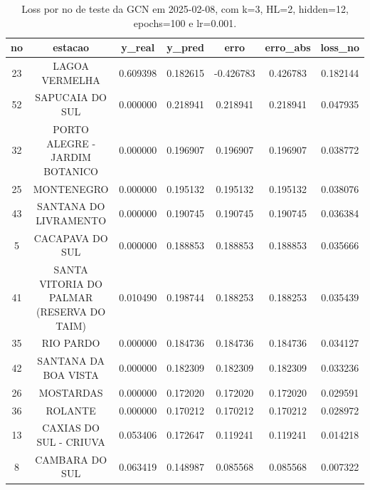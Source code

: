 \begin{table}[h]
\centering
\caption{Loss por no de teste da GCN em 2025-02-08, com k=3, HL=2, hidden=12, epochs=100 e lr=0.001.}
\label{tab:gcn_loss_k3_hl2_h12_e100_d20250208}
\begin{tabular}{ccccccc}
\toprule
no & estacao & y\_real & y\_pred & erro & erro\_abs & loss\_no \\
\midrule
23 & LAGOA VERMELHA & 0.609398 & 0.182615 & -0.426783 & 0.426783 & 0.182144 \\
52 & SAPUCAIA DO SUL & 0.000000 & 0.218941 & 0.218941 & 0.218941 & 0.047935 \\
32 & PORTO ALEGRE - JARDIM BOTANICO & 0.000000 & 0.196907 & 0.196907 & 0.196907 & 0.038772 \\
25 & MONTENEGRO & 0.000000 & 0.195132 & 0.195132 & 0.195132 & 0.038076 \\
43 & SANTANA DO LIVRAMENTO & 0.000000 & 0.190745 & 0.190745 & 0.190745 & 0.036384 \\
5 & CACAPAVA DO SUL & 0.000000 & 0.188853 & 0.188853 & 0.188853 & 0.035666 \\
41 & SANTA VITORIA DO PALMAR (RESERVA DO TAIM) & 0.010490 & 0.198744 & 0.188253 & 0.188253 & 0.035439 \\
35 & RIO PARDO & 0.000000 & 0.184736 & 0.184736 & 0.184736 & 0.034127 \\
42 & SANTANA DA BOA VISTA & 0.000000 & 0.182309 & 0.182309 & 0.182309 & 0.033236 \\
26 & MOSTARDAS & 0.000000 & 0.172020 & 0.172020 & 0.172020 & 0.029591 \\
36 & ROLANTE & 0.000000 & 0.170212 & 0.170212 & 0.170212 & 0.028972 \\
13 & CAXIAS DO SUL - CRIUVA & 0.053406 & 0.172647 & 0.119241 & 0.119241 & 0.014218 \\
8 & CAMBARA DO SUL & 0.063419 & 0.148987 & 0.085568 & 0.085568 & 0.007322 \\
\bottomrule
\end{tabular}
\end{table}

